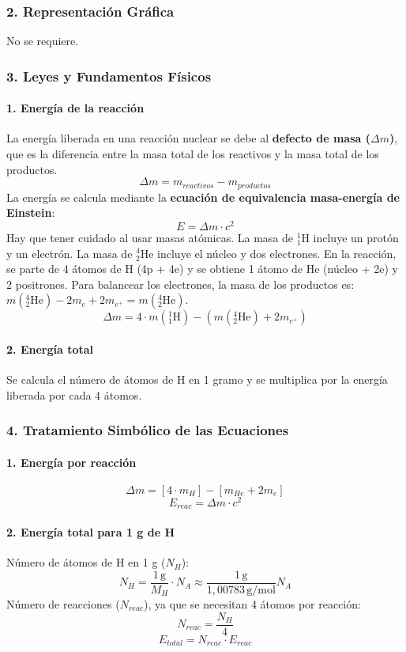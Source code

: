 \subsubsection*{2. Representación Gráfica}
No se requiere.

\subsubsection*{3. Leyes y Fundamentos Físicos}
\paragraph{1. Energía de la reacción}
La energía liberada en una reacción nuclear se debe al \textbf{defecto de masa ($\Delta m$)}, que es la diferencia entre la masa total de los reactivos y la masa total de los productos.
$$ \Delta m = m_{reactivos} - m_{productos} $$
La energía se calcula mediante la \textbf{ecuación de equivalencia masa-energía de Einstein}:
$$ E = \Delta m \cdot c^2 $$
Hay que tener cuidado al usar masas atómicas. La masa de ${}_1^1\text{H}$ incluye un protón y un electrón. La masa de ${}_2^4\text{He}$ incluye el núcleo y dos electrones. En la reacción, se parte de 4 átomos de H (4p + 4e) y se obtiene 1 átomo de He (núcleo + 2e) y 2 positrones. Para balancear los electrones, la masa de los productos es: $m({}_2^4\text{He}) - 2m_e + 2m_{e^+} = m({}_2^4\text{He})$.
$$ \Delta m = 4 \cdot m({}_1^1\text{H}) - (m({}_2^4\text{He}) + 2m_{e^+}) $$
\paragraph{2. Energía total}
Se calcula el número de átomos de H en 1 gramo y se multiplica por la energía liberada por cada 4 átomos.

\subsubsection*{4. Tratamiento Simbólico de las Ecuaciones}
\paragraph{1. Energía por reacción}
$$ \Delta m = [4 \cdot m_H] - [m_{He} + 2m_{e}] $$
$$ E_{reac} = \Delta m \cdot c^2 $$
\paragraph{2. Energía total para 1 g de H}
Número de átomos de H en 1 g ($N_H$):
$$ N_H = \frac{1\,\text{g}}{M_H} \cdot N_A \approx \frac{1\,\text{g}}{1,00783\,\text{g/mol}} N_A $$
Número de reacciones ($N_{reac}$), ya que se necesitan 4 átomos por reacción:
$$ N_{reac} = \frac{N_H}{4} $$
$$ E_{total} = N_{reac} \cdot E_{reac} $$

